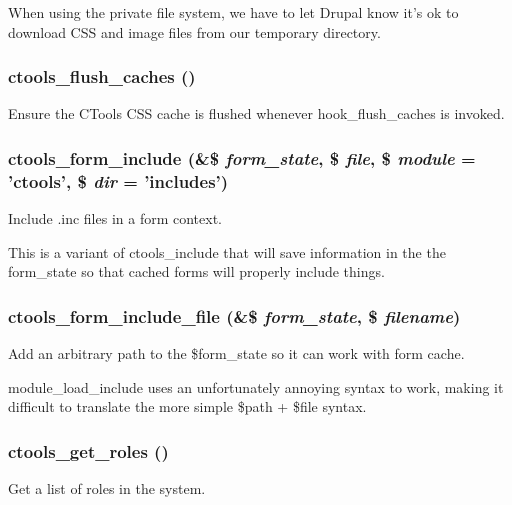 When using the private file system, we have to let Drupal know it's ok to download CSS and image files from our temporary directory. \hypertarget{ctools_8module_aa00f403972d4b65170a3effe89eec22e}{
\subsubsection[{ctools\_\-flush\_\-caches}]{\setlength{\rightskip}{0pt plus 5cm}ctools\_\-flush\_\-caches ()}}
\label{ctools_8module_aa00f403972d4b65170a3effe89eec22e}
Ensure the CTools CSS cache is flushed whenever hook\_\-flush\_\-caches is invoked. \hypertarget{ctools_8module_a79f73d0cd92770dbcf2c40699631cb8d}{
\subsubsection[{ctools\_\-form\_\-include}]{\setlength{\rightskip}{0pt plus 5cm}ctools\_\-form\_\-include (\&\$ {\em form\_\-state}, \/  \$ {\em file}, \/  \$ {\em module} = {\ttfamily 'ctools'}, \/  \$ {\em dir} = {\ttfamily 'includes'})}}
\label{ctools_8module_a79f73d0cd92770dbcf2c40699631cb8d}
Include .inc files in a form context.

This is a variant of ctools\_\-include that will save information in the the form\_\-state so that cached forms will properly include things. \hypertarget{ctools_8module_a8ad74264a9f461ec5748e498f1e8c0c1}{
\subsubsection[{ctools\_\-form\_\-include\_\-file}]{\setlength{\rightskip}{0pt plus 5cm}ctools\_\-form\_\-include\_\-file (\&\$ {\em form\_\-state}, \/  \$ {\em filename})}}
\label{ctools_8module_a8ad74264a9f461ec5748e498f1e8c0c1}
Add an arbitrary path to the \$form\_\-state so it can work with form cache.

module\_\-load\_\-include uses an unfortunately annoying syntax to work, making it difficult to translate the more simple \$path + \$file syntax. \hypertarget{ctools_8module_a3d56126c4b5208ea2d39019aeef57217}{
\subsubsection[{ctools\_\-get\_\-roles}]{\setlength{\rightskip}{0pt plus 5cm}ctools\_\-get\_\-roles ()}}
\label{ctools_8module_a3d56126c4b5208ea2d39019aeef57217}
Get a list of roles in the system.

